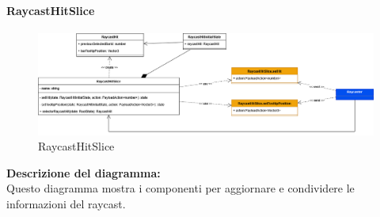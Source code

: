 \paragraph{RaycastHitSlice}
\begin{figure}[h!] \centering
    \includegraphics[scale=0.35]{template/images/uml_front/logic/raycasthitslice.png}
    \caption{RaycastHitSlice}
\end{figure}
\textbf{Descrizione del diagramma:}\\
Questo diagramma mostra i componenti per aggiornare e condividere le informazioni del raycast.
